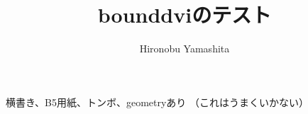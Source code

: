 \documentclass[b5paper,tombow]{jarticle}
\title{\textsf{bounddvi}のテスト}
\author{Hironobu Yamashita}
\begin{document}
横書き、B5用紙、トンボ、geometryあり
（これはうまくいかない）
\end{document}

